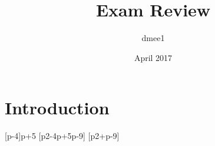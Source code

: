 \documentclass{article}
\title{Exam Review}
\author{dmee1 }
\date{April 2017}
\begin{document}
\maketitle
\section{Introduction}
[p-4]{p+5}
[p2-4p+5p-9]
[p2+p-9]
\end{document}
